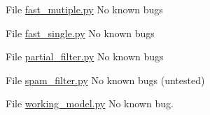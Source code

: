 
\begin{DoxyRefList}
\item[File \mbox{\hyperlink{fast__mutiple_8py}{fast\+\_\+mutiple.py}} ]\label{bug__bug000001}%
%
No known bugs  
\item[File \mbox{\hyperlink{fast__single_8py}{fast\+\_\+single.py}} ]\label{bug__bug000002}%
%
No known bugs  
\item[File \mbox{\hyperlink{partial__filter_8py}{partial\+\_\+filter.py}} ]\label{bug__bug000003}%
%
No known bugs  
\item[File \mbox{\hyperlink{spam__filter_8py}{spam\+\_\+filter.py}} ]\label{bug__bug000004}%
%
No known bugs (untested)  
\item[File \mbox{\hyperlink{working__model_8py}{working\+\_\+model.py}} ]\label{bug__bug000005}%
%
No known bug. 
\end{DoxyRefList}